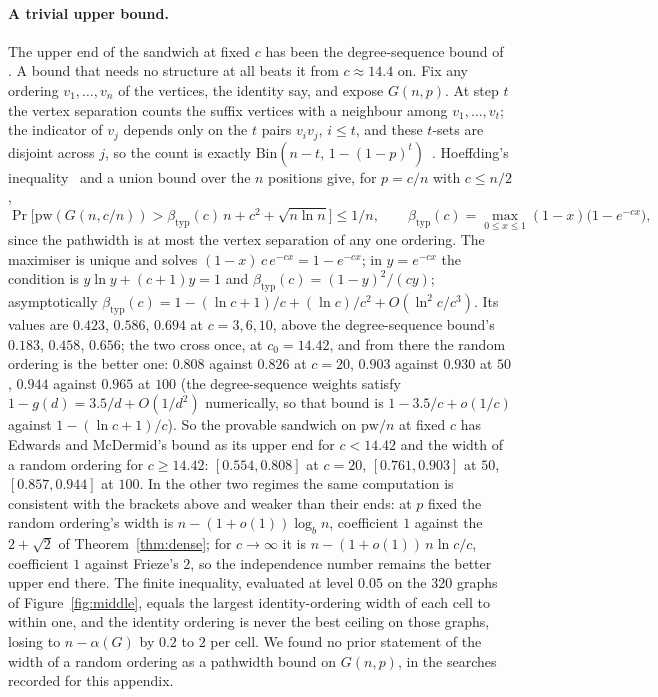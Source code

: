 \paragraph{A trivial upper bound.}
The upper end of the sandwich at fixed $c$ has been the degree-sequence bound
of \citet[Corollary~5.2]{EdwardsMcDermid2015}. A bound that needs no structure
at all beats it from $c\approx14.4$ on. Fix any ordering $v_{1},\dots,v_{n}$ of
the vertices, the identity say, and expose $G(n,p)$. At step $t$ the vertex
separation counts the suffix vertices with a neighbour among $v_{1},\dots,v_{t}$;
the indicator of $v_{j}$ depends only on the $t$ pairs $v_{i}v_{j}$, $i\le t$,
and these $t$-sets are disjoint across $j$, so the count is exactly
$\mathrm{Bin}(n-t,\,1-(1-p)^{t})$~. Hoeffding's
inequality~\citep{Hoeffding1963} and a union bound over the $n$ positions give,
for $p=c/n$ with $c\le n/2$,
\[
  \Pr\bigl[\mathrm{pw}(G(n,c/n))>\beta_{\mathrm{typ}}(c)\,n+c^{2}+\sqrt{n\ln n}\bigr]\le 1/n,
  \qquad
  \beta_{\mathrm{typ}}(c)=\max_{0\le x\le1}(1-x)\bigl(1-e^{-cx}\bigr),
\]
since the pathwidth is at most the vertex separation of any one ordering. The
maximiser is unique and solves $(1-x)\,c\,e^{-cx}=1-e^{-cx}$; in
$y=e^{-cx}$ the condition is $y\ln y+(c+1)y=1$ and
$\beta_{\mathrm{typ}}(c)=(1-y)^{2}/(cy)$; asymptotically
$\beta_{\mathrm{typ}}(c)=1-(\ln c+1)/c+(\ln c)/c^{2}+O(\ln^{2}c/c^{3})$.
Its values are $0.423$, $0.586$, $0.694$ at $c=3,6,10$, above the
degree-sequence bound's $0.183$, $0.458$, $0.656$; the two cross once, at
$c_{0}=14.42$, and from there the random ordering is the better one:
$0.808$ against $0.826$ at $c=20$, $0.903$ against $0.930$ at $50$, $0.944$
against $0.965$ at $100$ (the degree-sequence weights satisfy
$1-g(d)=3.5/d+O(1/d^{2})$ numerically, so that bound is $1-3.5/c+o(1/c)$
against $1-(\ln c+1)/c$). So the provable sandwich on $\mathrm{pw}/n$ at fixed
$c$ has Edwards and McDermid's bound as its upper end for $c<14.42$ and the
width of a random ordering for $c\ge14.42$: $[0.554,0.808]$ at $c=20$,
$[0.761,0.903]$ at $50$, $[0.857,0.944]$ at $100$. In the other two regimes
the same computation is consistent with the brackets above and weaker than
their ends: at $p$ fixed the random ordering's width is
$n-(1+o(1))\log_{b}n$, coefficient $1$ against the $2+\sqrt2$ of
Theorem~\ref{thm:dense}; for $c\to\infty$ it is
$n-(1+o(1))\,n\ln c/c$, coefficient $1$ against Frieze's $2$, so the
independence number remains the better upper end there. The finite
inequality, evaluated at level $0.05$ on the 320 graphs of
Figure~\ref{fig:middle}, equals the largest identity-ordering width of each
cell to within one, and the identity ordering is never the best ceiling on
those graphs, losing to $n-\alpha(G)$ by $0.2$ to $2$ per cell. We found no
prior statement of the width of a random ordering as a pathwidth bound on
$G(n,p)$, in the searches recorded for this appendix.

